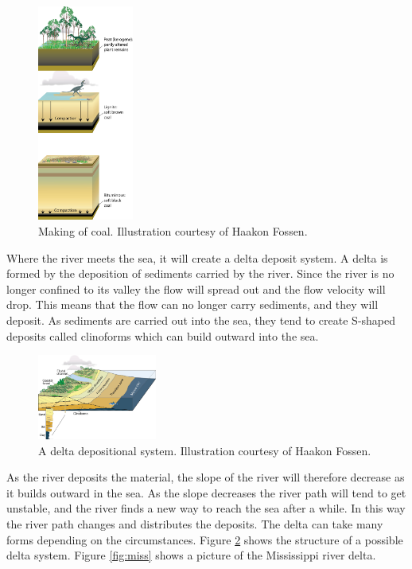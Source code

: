 \documentclass[a4paper,12pt]{report}
\begin{document}
\begin{figure}
  \begin{center}
   \vspace{-15pt}
    \includegraphics[width=0.28\textwidth]{thesis/geo/english/coal.jpg}
  \end{center}
   \vspace{-15pt}
  \caption{Making of coal. Illustration courtesy of Haakon Fossen.}
  \label{fig:coal}
\end{figure}

Where the river meets the sea, it will create a delta deposit system. A delta is formed by the deposition of sediments carried by the river. Since the river is no longer confined to its valley the flow will spread out and the flow velocity will drop. This means that the flow can no longer carry sediments, and they will deposit. As sediments are carried out into the sea, they tend to create S-shaped deposits called clinoforms which can build outward into the sea.
\begin{figure}
 \centering

    \includegraphics[width=0.35\textwidth]{thesis/geo/english/Delta3D.jpg}
  
  \caption{A delta depositional system. Illustration courtesy of Haakon Fossen.}
  \label{fig:delta}
\end{figure}
As the river deposits the material, the slope of the river will therefore decrease as it builds outward in the sea. As the slope decreases the river path will tend to get unstable, and the river finds a new way to reach the sea after a while. In this way the river path changes and distributes the deposits. The delta can take many forms depending on the circumstances. Figure \ref{fig:delta} shows the structure of a possible delta system. Figure \ref{fig:miss} shows a picture of the Mississippi river delta.
\end{document}
